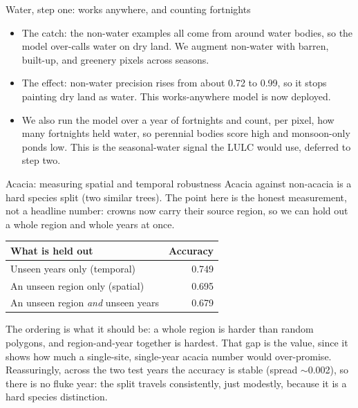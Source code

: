 \documentclass[aspectratio=169]{beamer}
\begin{document}
\begin{frame}{Water, step one: works anywhere, and counting fortnights}
\begin{itemize}\small
  \item The catch: the non-water examples all come from around water bodies, so the model over-calls
  water on dry land. We augment non-water with barren, built-up, and greenery pixels across seasons.
  \item The effect: non-water precision rises from about 0.72 to 0.99, so it stops painting dry land as
  water. This works-anywhere model is now deployed.
  \item We also run the model over a year of fortnights and count, per pixel, how many fortnights held
  water, so perennial bodies score high and monsoon-only ponds low. This is the seasonal-water signal the
  LULC would use, deferred to step two.
\end{itemize}
\end{frame}

\begin{frame}{Acacia: measuring spatial and temporal robustness}
Acacia against non-acacia is a hard species split (two similar trees). The point here is the honest
measurement, not a headline number: crowns now carry their source region, so we can hold out a whole
region and whole years at once.
\vspace{2mm}
\centering
\begin{tabular}{lr}
\toprule
What is held out & Accuracy \\
\midrule
Unseen years only (temporal) & 0.749 \\
An unseen region only (spatial) & 0.695 \\
An unseen region \emph{and} unseen years & 0.679 \\
\bottomrule
\end{tabular}
\vspace{2mm}
\begin{flushleft}\small
The ordering is what it should be: a whole region is harder than random polygons, and region-and-year
together is hardest. That gap is the value, since it shows how much a single-site, single-year acacia
number would over-promise. Reassuringly, across the two test years the accuracy is stable (spread
$\sim$0.002), so there is no fluke year: the split travels consistently, just modestly, because it is a
hard species distinction.
\end{flushleft}
\end{frame}
\end{document}
